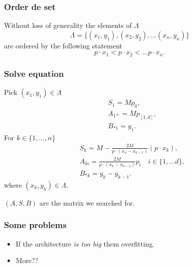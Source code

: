 \begin{frame}
    \frametitle{Order de set}
    Without loss of generality the elements of $\Lambda$
    \begin{equation*}
        \Lambda = \{(x_1,y_1), (x_2,y_2), \ldots (x_n, y_n)\}
    \end{equation*}
    are ordered by the following statement
    \begin{equation}
        p \cdot x_1 < p \cdot x_2< \ldots p \cdot x_n.
    \end{equation}
\end{frame}

\begin{frame}
    \frametitle{Solve equation}

    Pick  $(x_1, y_1) \in \Lambda$ \\
    \begin{align*}
         &S_1 = M p_0, \\
         & A_{1 *} = M p_{[1,d]}, \\
         & B_{* 1} = y_1.
     \end{align*}
    For $k \in \{1, \ldots, n \}$
     \begin{align*}
         &S_{k} = M -  \frac{2 M}{p \cdot (x_k - x_{k-1})}(p \cdot x_{k}),\\
         & A_{k i} = \frac{2 M}{p \cdot (x_k - x_{k-1})}
         p_{i}  \quad i \in \{1, \ldots d\},\\
         & B_{* k} = y_k - y_{k-1}.
     \end{align*} 
     where $(x_k, y_k) \in \Lambda$.

     $(A,S,B)$ are the matrix we searched for.
\end{frame}

\begin{frame}
    \frametitle{Some problems}
    \begin{itemize}
        \item If the architecture \textit{is too big} them overfitting.
        \item More??
    \end{itemize}
\end{frame}

